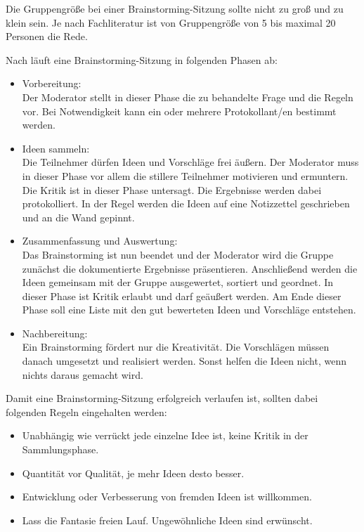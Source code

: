 Die Gruppengröße bei einer Brainstorming-Sitzung sollte nicht zu groß und zu klein sein.  \glqq Je nach Fachliteratur ist von Gruppengröße von 5 bis maximal 20 Personen die Rede\grqq{}. \cite{Pas2012}\bigskip

Nach \cite{Rei2007} läuft eine Brainstorming-Sitzung in folgenden Phasen ab: 

\begin{itemize} 
\item Vorbereitung: \\
Der Moderator stellt in dieser Phase die zu behandelte Frage und die Regeln vor. Bei Notwendigkeit kann ein oder mehrere Protokollant/en bestimmt werden.

\item Ideen sammeln: \\
Die Teilnehmer dürfen Ideen und Vorschläge frei äußern. Der Moderator muss in dieser Phase vor allem die stillere Teilnehmer motivieren und ermuntern. Die Kritik ist in dieser Phase untersagt. Die Ergebnisse werden dabei protokolliert. In der Regel werden die Ideen auf eine Notizzettel geschrieben und an die Wand gepinnt.

\item Zusammenfassung und Auswertung: \\
Das Brainstorming ist nun beendet und der Moderator wird die Gruppe zunächst die dokumentierte Ergebnisse präsentieren. Anschließend werden die Ideen gemeinsam mit der Gruppe ausgewertet, sortiert und geordnet. In dieser Phase ist Kritik erlaubt und darf geäußert werden. Am Ende dieser Phase soll eine Liste mit den gut bewerteten Ideen und Vorschläge entstehen.

\item Nachbereitung: \\
Ein Brainstorming fördert nur die Kreativität. Die Vorschlägen müssen danach umgesetzt und realisiert werden. Sonst helfen die Ideen nicht, wenn nichts daraus gemacht wird.
\end{itemize}

Damit eine Brainstorming-Sitzung erfolgreich verlaufen ist, sollten dabei folgenden Regeln eingehalten werden:

\begin{itemize} 
\item Unabhängig wie verrückt jede einzelne Idee ist, keine Kritik in der Sammlungsphase.
\item Quantität vor Qualität, je mehr Ideen desto besser.
\item Entwicklung oder Verbesserung von fremden Ideen ist willkommen.
\item Lass die Fantasie freien Lauf. Ungewöhnliche Ideen sind erwünscht.
\end{itemize}


